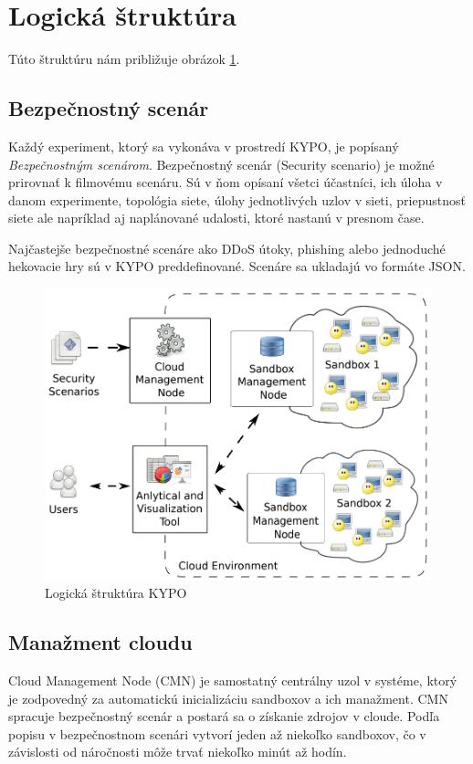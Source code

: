 \documentclass[
  digital, %
  twoside, %
  notable,   %
  nolof,   %
  nolot,   %
]{fithesis3}
\begin{document}
\section{Logická štruktúra}
Túto štruktúru nám približuje obrázok \ref{kypo_logic_structure}.

\subsection{Bezpečnostný scenár}
Každý experiment, ktorý sa vykonáva v prostredí KYPO, je popísaný \textit{Bezpečnostným scenárom}. Bezpečnostný scenár (Security scenario) je možné prirovnať k filmovému scenáru. Sú v ňom opísaní všetci účastníci, ich úloha v danom experimente, topológia siete, úlohy jednotlivých uzlov v sieti, priepustnosť siete ale napríklad aj naplánované udalosti, ktoré nastanú v presnom čase\cite{eichler2014analytical, eichler2015kypo}.

Najčastejše bezpečnostné scenáre ako DDoS útoky, phishing alebo jednoduché hekovacie hry sú v KYPO preddefinované. Scenáre sa ukladajú vo formáte JSON\cite{eichler2015kypo}.

\begin{figure}
	\center
	\includegraphics[width=0.875\linewidth]{kypo_logic_structure}
	\caption{Logická štruktúra KYPO\cite{eichler2015kypo}}
	\label{kypo_logic_structure}
\end{figure}

\subsection{Manažment cloudu}
Cloud Management Node (CMN) je samostatný centrálny uzol v systéme, ktorý je zodpovedný za automatickú inicializáciu sandboxov a ich manažment. CMN spracuje bezpečnostný scenár a postará sa o získanie zdrojov v cloude. Podľa popisu v bezpečnostnom scenári vytvorí jeden až niekoľko sandboxov, čo v závislosti od náročnosti môže trvať niekoľko minút až hodín\cite{eichler2015kypo}.
\end{document}
